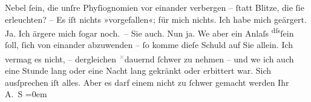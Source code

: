\begin{ledgroupsized}[t]{13cm}
               Nebel ſein, die unſre Phyſiognomien vor einander verbergen – ſtatt Blitze, die ſie
               erleuchten?\pend
           \pstart
           – Es iſt nichts »vorgefallen«; für mich nichts. Ich habe mich geärgert.
               Ja. Ich ärgere mich ſogar noch. – Sie auch. Nun ja. We{\geminationn}
               aber ein Anlaſs \substVorne{}\textsuperscript{dſs}\substDazwischen{}ſein ſoll\substHinten{}, ſich von einander abzu{\pb}wenden – ſo
               komme dieſe Schuld auf Sie allein. Ich vermag es nicht, – dergleichen \substVorne{}\textsuperscript{\textcolor{gray}{×}}\substDazwischen{}dauernd\substHinten{} ſchwer zu nehmen – und we{\geminationn} ich auch \strikeout{\textcolor{gray}{×}\-\textcolor{gray}{×}\-\textcolor{gray}{×}\-\textcolor{gray}{×}\-\textcolor{gray}{×}\-\textcolor{gray}{×}\-\textcolor{gray}{×}\-\textcolor{gray}{×}\-\textcolor{gray}{×}}{ }\strikeout{\textcolor{gray}{und}} eine Stunde lang oder eine Nacht lang gekränkt oder erbittert war. Sich
               ausſprechen iſt alles. Aber es darf einem nicht {\pb}zu ſchwer gemacht werden\pend
           \pstart
           Ihr {\\[\baselineskip]}\spacefill\mbox{A. S}\pend
           \leftskip=0em{}
         
         \endnumbering{}\end{ledgroupsized}  \newcommand{\dateiname}{L02989}\newcommand{\titel}{Arthur Schnitzler an Felix Salten, 10. 11. 1903}\newcommand{\editorInnen}{Martin Anton Müller und Laura Untner}
      
